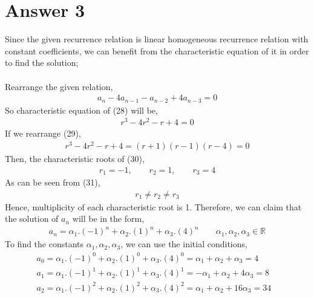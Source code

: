 \documentclass[12pt]{article}
\newcommand{\R}{\mathbb{R}}
\begin{document}
\section*{Answer 3}
Since the given recurrence relation is linear homogeneous recurrence relation with constant coefficients, we can benefit from the characteristic equation of it in order to find the solution;\\ \\
Rearrange the given relation,
\begin{equation}
\begin{split}
a_{n} -4a_{n-1} - a_{n-2} + 4a_{n-3} = 0
\end{split}
\end{equation}
So characteristic equation of (28) will be,
\begin{equation}
\begin{split}
r^3 - 4r^2 -r + 4 = 0
\end{split}
\end{equation}
If we rearrange (29),
\begin{equation}
\begin{split}
r^3 - 4r^2 -r + 4 = (r+1)(r-1)(r-4) = 0
\end{split}
\end{equation}
Then, the characteristic roots of (30),
\begin{equation}
\begin{split}
r_{1} = -1, \qquad r_{2} = 1, \qquad r_{3} = 4
\end{split}
\end{equation}
As can be seen from (31),
\begin{equation}
\begin{split}
r_{1} \neq  r_{2} \neq r_{3}
\end{split}
\end{equation}
Hence, multiplicity of each characteristic root is 1. Therefore, we can claim that the solution of $a_{n}$ will be in the form,\\
\begin{equation}
\begin{split}
a_{n} = \alpha_{1}.(-1)^n + \alpha_{2}.(1)^n + \alpha_{3}.(4)^n \qquad \alpha_{1},\alpha_{2},\alpha_{3} \in \R
\end{split}
\end{equation}
To find the constants $\alpha_{1},\alpha_{2},\alpha_{3}$, we can use the initial conditions,
\begin{equation}
\begin{split}
a_{0} = \alpha_{1}.(-1)^0 + \alpha_{2}.(1)^0 + \alpha_{3}.(4)^0 = \alpha_{1} + \alpha_{2} + \alpha_{3} = 4 & \\ a_{1} = \alpha_{1}.(-1)^1 + \alpha_{2}.(1)^1 + \alpha_{3}.(4)^1 = -\alpha_{1} + \alpha_{2} + 4\alpha_{3} = 8 & \\ a_{2} = \alpha_{1}.(-1)^2 + \alpha_{2}.(1)^2 + \alpha_{3}.(4)^2 = \alpha_{1} + \alpha_{2} + 16\alpha_{3} = 34
\end{split}
\end{equation}
\end{document}
